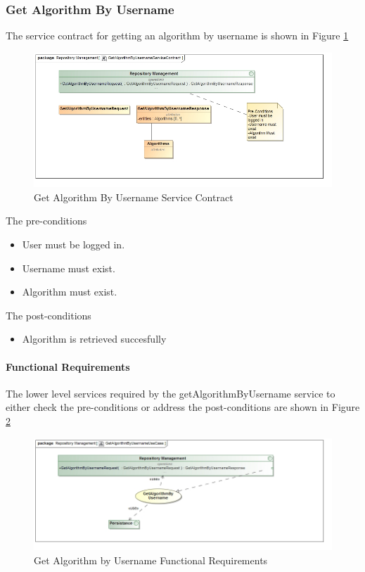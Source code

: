 \subsubsection{Get Algorithm By Username}
The service contract for getting an algorithm by username is shown in Figure \ref{fig:getAlgorithmByUsername}
\begin{figure}[H]
	\begin{center}
		\includegraphics[scale=0.6]{../Diagrams and Charts/Test Data/GetAlgorithmByUsernameServiceContract.jpg}
		\caption{Get Algorithm By Username Service Contract}
		\label{fig:getAlgorithmByUsername}
	\end{center}
	
\end{figure}	

The pre-conditions
\begin{itemize}
	\item User must be logged in.
	\item Username must exist.
	\item Algorithm must exist.
\end{itemize}

The post-conditions
\begin{itemize}
	\item Algorithm is retrieved succesfully
\end{itemize}
\paragraph{Functional Requirements}
The lower level services required by the getAlgorithmByUsername service to either check the
pre-conditions or address the post-conditions are shown in Figure \ref{fig:getAlgorithmByUsernameUseCase}
\begin{figure}[H]
	\begin{center}
		\includegraphics[scale=0.6]{../Diagrams and Charts/Test Data/GetAlgorithmByUsernameUseCase.jpg}
		\caption{Get Algorithm by Username Functional Requirements}
		\label{fig:getAlgorithmByUsernameUseCase}
	\end{center}
\end{figure}

